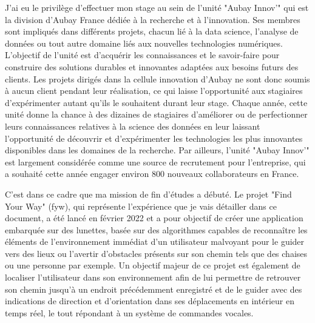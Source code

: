 \documentclass[11pt]{article}
\begin{document}
    J'ai eu le privilège d'effectuer mon stage au sein de l'unité "Aubay Innov'" qui est la division d’Aubay France dédiée 
    à la recherche et à l'innovation. Ses membres sont impliqués dans différents projets, chacun lié à la data science, l'analyse 
    de données ou tout autre domaine liés aux nouvelles technologies numériques. L'objectif de l'unité est d'acquérir 
    les connaissances et le savoir-faire pour construire des solutions durables et innovantes adaptées aux besoins futurs des clients. 
    Les projets dirigés dans la cellule innovation d'Aubay ne sont donc soumis à aucun client pendant leur réalisation, 
    ce qui laisse l'opportunité aux stagiaires d'expérimenter autant qu'ils le souhaitent durant leur stage.
    Chaque année, cette unité donne la chance à des dizaines de stagiaires d'améliorer ou de perfectionner leurs connaissances
    relatives à la science des données en leur laissant l'opportunité de découvrir et d'expérimenter les technologies les plus 
    innovantes disponibles dans les domaines de la recherche. Par ailleurs, l'unité "Aubay Innov'" est largement considérée comme 
    une source de recrutement pour l'entreprise, qui a souhaité cette année engager environ 800 nouveaux collaborateurs en France. 
    
    C'est dans ce cadre que ma mission de fin d'études a débuté. Le projet "Find Your Way" (\acrshort{fyw}), qui représente l'expérience que je 
    vais détailler dans ce document, a été lancé en février 2022 et a pour objectif de créer une application embarquée sur des lunettes, 
    basée sur des algorithmes capables de reconnaître les éléments de l'environnement immédiat d'un utilisateur malvoyant pour le guider 
    vers des lieux ou l'avertir d'obstacles présents sur son chemin tels que des chaises ou une personne par exemple. Un objectif majeur 
    de ce projet est également de localiser l'utilisateur dans son environnement afin de lui permettre de retrouver son chemin jusqu'à
    un endroit précédemment enregistré et de le guider avec des indications de direction et d'orientation dans ses déplacements en intérieur
    en temps réel, le tout répondant à un système de commandes vocales.  
    
\end{document}
